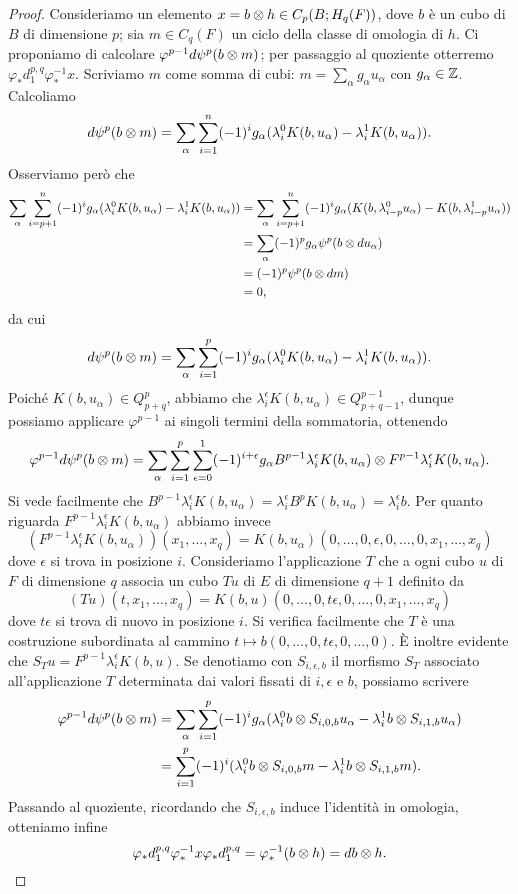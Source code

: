\begin{proof}
Consideriamo un elemento $x=b\mathbin{\otimes} h\in C_p(B;H_q(F))$, dove $b$ è un cubo di $B$ di dimensione $p$; sia $m\in C_q(F)$ un ciclo della classe di omologia di $h$. Ci proponiamo di calcolare $\varphi^{p-1}d\psi^p(b\mathbin{\otimes} m)$; per passaggio al quoziente otterremo $\varphi_*d^{p,q}_1\varphi_*^{-1}x$. Scriviamo $m$ come somma di cubi: $m=\sum_{\alpha}g_\alpha u_\alpha$ con $g_\alpha\in\mathbb{Z}$. Calcoliamo
$$
d\psi^p(b\mathbin{\otimes} m)=\sum_\alpha\sum_{i=1}^n(-1)^ig_\alpha(\lambda^0_iK(b,u_\alpha)-\lambda^1_iK(b,u_\alpha)).
$$
Osserviamo però che
\begin{align*}
\sum_{\alpha}\sum_{i=p+1}^n(-1)^ig_\alpha(\lambda^0_iK(b,u_\alpha)-\lambda^1_iK(b,u_\alpha))&=\sum_{\alpha}\sum_{i=p+1}^n(-1)^ig_\alpha(K(b,\lambda^0_{i-p}u_\alpha)-K(b,\lambda^1_{i-p}u_\alpha))\\
&=\sum_\alpha(-1)^pg_\alpha\psi^p(b\mathbin{\otimes} du_\alpha)\\
&=(-1)^p\psi^p(b\mathbin{\otimes} dm)\\
&=0,
\end{align*}
da cui
$$
d\psi^p(b\mathbin{\otimes} m)=\sum_\alpha\sum_{i=1}^p(-1)^ig_\alpha(\lambda^0_iK(b,u_\alpha)-\lambda^1_iK(b,u_\alpha)).
$$
Poiché $K(b,u_\alpha)\in Q^p_{p+q}$, abbiamo che $\lambda^\epsilon_iK(b,u_\alpha)\in Q^{p-1}_{p+q-1}$, dunque possiamo applicare $\varphi^{p-1}$ ai singoli termini della sommatoria, ottenendo
$$
\varphi^{p-1}d\psi^p(b\mathbin{\otimes} m)=\sum_\alpha\sum_{i=1}^p\sum_{\epsilon=0}^1(-1)^{i+\epsilon}g_\alpha B^{p-1}\lambda^\epsilon_iK(b,u_\alpha)\mathbin{\otimes} F^{p-1}\lambda^\epsilon_iK(b,u_\alpha).
$$
Si vede facilmente che $B^{p-1}\lambda^{\epsilon}_iK(b,u_\alpha)=\lambda^\epsilon_i B^pK(b,u_\alpha)=\lambda^\epsilon_ib$. Per quanto riguarda $F^{p-1}\lambda^\epsilon_iK(b,u_\alpha)$ abbiamo invece
$$
(F^{p-1}\lambda^\epsilon_iK(b,u_\alpha))(x_1,\ldots,x_q)=K(b,u_\alpha)(0,\ldots,0,\epsilon,0,\ldots,0,x_1,\ldots,x_q)
$$
dove $\epsilon$ si trova in posizione $i$. Consideriamo l'applicazione $T$ che a ogni cubo $u$ di $F$ di dimensione $q$ associa un cubo $Tu$ di $E$ di dimensione $q+1$ definito da
$$
(Tu)(t,x_1,\ldots,x_q)=K(b,u)(0,\ldots,0,t\epsilon,0,\ldots,0,x_1,\ldots,x_q)
$$
dove $t\epsilon$ si trova di nuovo in posizione $i$. Si verifica facilmente che $T$ è una costruzione subordinata al cammino $t\mapsto b(0,\ldots,0,t\epsilon,0,\ldots,0)$. È inoltre evidente che $S_Tu=F^{p-1}\lambda^\epsilon_iK(b,u)$. Se denotiamo con $S_{i,\epsilon,b}$ il morfismo $S_T$ associato all'applicazione $T$ determinata dai valori fissati di $i,\epsilon$ e $b$, possiamo scrivere
\begin{align*}
\varphi^{p-1}d\psi^p(b\mathbin{\otimes} m)&=\sum_\alpha\sum_{i=1}^p(-1)^{i}g_\alpha(\lambda^0_ib\mathbin{\otimes} S_{i,0,b}u_\alpha-\lambda^1_ib\mathbin{\otimes} S_{i,1,b}u_\alpha)\\
&=\sum_{i=1}^p(-1)^i(\lambda^0_ib\mathbin{\otimes} S_{i,0,b}m-\lambda^1_ib\mathbin{\otimes} S_{i,1,b}m).
\end{align*}
Passando al quoziente, ricordando che $S_{i,\epsilon, b}$ induce l'identità in omologia, otteniamo infine
$$
\varphi_*d^{p,q}_1\varphi_*^{-1}x\varphi_*d^{p,q}_1=\varphi_*^{-1}(b\mathbin{\otimes} h)=db\mathbin{\otimes} h.
$$
\end{proof}
